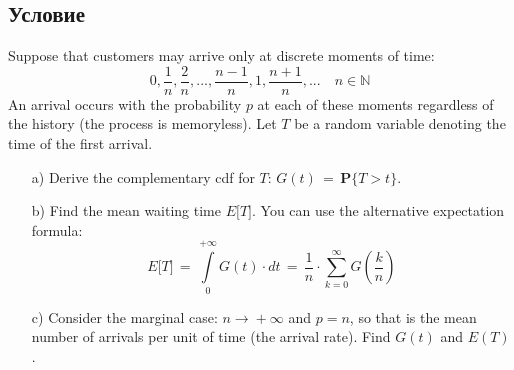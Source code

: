 \documentclass{article}
\begin{document}
\subsection*{Условие}
Suppose that customers may arrive only at discrete moments of time:
\[ 0,\dfrac{1}{n},\dfrac{2}{n},...,\dfrac{n \! - \! 1}{n},1,\dfrac{n \! + \! 1}{n},... \quad n \! \in \! \mathbb{N} \]
An arrival occurs with the probability $ p $ at each of these moments regardless of the history (the process is memoryless). Let $ T $ be a random variable denoting the time of the first arrival.
\begin{enumerate}
\item[a)] Derive the complementary cdf for $ T: \, G(t) \, = \, \mathbf{P} \big\{ T \! > \! t \big\} $.
\item[b)] Find the mean waiting time $ E \big[ T \big] $. You can use the alternative expectation formula:
\[ E \big[ T \big] \, = \, \int\limits_0^{+\infty} G(t) \! \cdot \! dt \, = \, \dfrac{1}{n} \! \cdot \! \sum\limits_{k=0}^\infty G \left( \dfrac{k}{n} \right) \]
\item[c)] Consider the marginal case: $ n \! \rightarrow \! +\infty $ and $ p \! = \! n $, so that is the mean number of arrivals per unit of time (the arrival rate). Find $ G(t) $ and $ E(T) $.
\end{enumerate}
\end{document}
